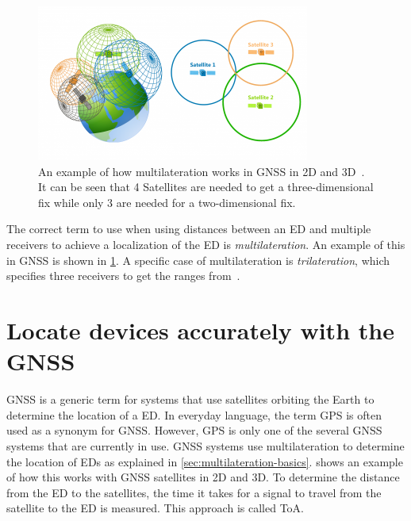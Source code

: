 \begin{figure}[htbp]
    \centering
    \includegraphics[width=0.8\textwidth]{pictures/multilateration/gps_multilateration.png}
    \caption{
        An example of how multilateration works in \ac{GNSS} in 2D and 3D~\protect\cite{gisgeography_how_2018}.
        It can be seen that 4 Satellites are needed to get a three-dimensional fix while only 3 are needed for a two-dimensional fix.
    }\label{pic:multilateration-gps-2d-3d-example}
\end{figure}

The correct term to use when using distances between an \acl{ED} and multiple receivers to achieve a localization of the \acl{ED} is \emph{multilateration}.
An example of this in \ac{GNSS} is shown in \cref{pic:multilateration-gps-2d-3d-example}.
A specific case of multilateration is \emph{trilateration}, which specifies three receivers to get the ranges from~\cite{ruiz_efficient_2013}.

\section{Locate devices accurately with the \acl{GNSS}}

\ac{GNSS} is a generic term for systems that use satellites orbiting the Earth to determine the location of a \acl{ED}.
In everyday language, the term \ac{GPS} is often used as a synonym for \ac{GNSS}.
However, \ac{GPS} is only one of the several \ac{GNSS} systems that are currently in use.
\ac{GNSS} systems use multilateration to determine the location of \aclp{ED} as explained in \cref{sec:multilateration-basics}.
 shows an example of how this works with \ac{GNSS} satellites in 2D and 3D.
To determine the distance from the \acl{ED} to the satellites, the time it takes for a signal to travel from the satellite to the \acl{ED} is measured.
This approach is called \acf{ToA}.

